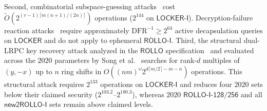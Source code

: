 \documentclass[11pt,a4paper]{article}
\theoremstyle{definition}
\theoremstyle{remark}
\begin{document}
Second, combinatorial subspace-guessing attacks~\cite{GMRZ13,LOCKER17} cost $\widetilde{O}(2^{(r-1)\lceil m(n+1)/(2n)\rceil})$ operations ($2^{144}$ on $\mathsf{LOCKER\text{-}I}$). Decryption-failure reaction attacks~\cite{SSL19} require approximately $\mathrm{DFR}^{-1} \ge 2^{64}$ active decapsulation queries on $\mathsf{LOCKER}$ and do not apply to ephemeral $\mathsf{ROLLO\text{-}I}$. Third, the structural dual-LRPC key recovery attack analyzed in the $\mathsf{ROLLO}$ specification~\cite[\S6.2]{ROLLO20} and evaluated across the $2020$ parameters by Song et al.~\cite{SZHW23} searches for rank-$d$ multiples of $(y, -x)$ up to $n$ ring shifts in $O((nm)^\omega 2^{d\lceil m/2\rceil - m - n})$ operations. This structural attack requires $2^{133}$ operations on $\mathsf{LOCKER\text{-}I}$ and reduces four $2020$ sets below their claimed security ($2^{103.2}\text{--}2^{180.3}$), whereas $2020$ $\mathsf{ROLLO\text{-}I\text{-}128/256}$ and all $\mathsf{new2ROLLO\text{-}I}$ sets remain above claimed levels.
\end{document}
